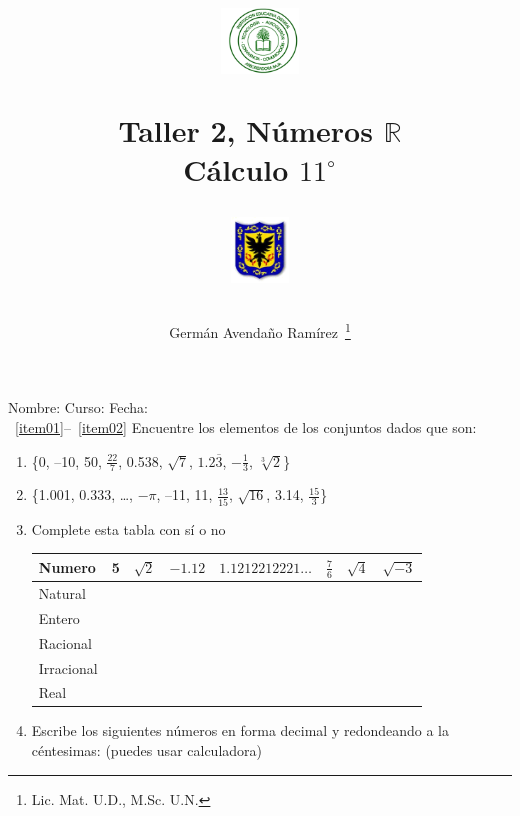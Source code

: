 \documentclass[10pt,twoside]{article}
\author{Germ\'an Avenda\~no Ram\'irez~\thanks{Lic. Mat. U.D., M.Sc. U.N.}}
\title{\begin{minipage}{.2\textwidth}
\includegraphics[height=1.75cm]{Images/logo-colegio.png}\end{minipage}
\begin{minipage}{.55\textwidth}
\begin{center}
Taller 2, Números $\mathbb{R}$\\
Cálculo $11^{\circ}$
\end{center}
\end{minipage}\hfill
\begin{minipage}{.2\textwidth}
\includegraphics[height=1.75cm]{Images/logo-sed.png} 
\end{minipage}}
\date{}
\begin{document}
\maketitle
Nombre: \hrulefill Curso: \underline{\hspace*{44pt}} Fecha: \underline{\hspace*{2.5cm}}\\

~\ref{item01}--~\ref{item02} Encuentre los elementos de los conjuntos dados que son:
\begin{enumerate}
\item \{0, --10, 50, $\frac{22}{7}$, 0.538, $\sqrt{7}$, $1.2\overline{3}$, $-\frac{1}{3}$, $\sqrt[3]{2}$\}\label{item01}
\item \{1.001, 0.333, \ldots, $-\pi$, --11, 11, $\frac{13}{15}$, $\sqrt{16}$, 3.14, $\frac{15}{3}$\}\label{item02}
\begin{enumerate}
\end{enumerate}
  \item Complete esta tabla con sí o no
  \begin{center}
  \begin{tabular}{|l|c|c|c|c|c|c|c|}
\hline 
Numero & 5 & $\sqrt{2}$ & $-1.12$ & $1.1212212221\ldots$ & $\frac{7}{6}$ & $\sqrt{4}$ & $\sqrt{-3}$ \\ 
\hline 
Natural &  &  &  &  &  &  &  \\ 
\hline 
Entero &  &  &  &  &  &  &  \\ 
\hline 
Racional &  &  &  &  &  &  &  \\ 
\hline 
Irracional &  &  &  &  &  &  &  \\ 
\hline 
Real &  &  &  &  &  &  &  \\ 
\hline 
\end{tabular} 
  \end{center}
    \item Escribe los siguientes números en forma decimal y redondeando a la céntesimas: (puedes usar calculadora)
  \begin{enumerate}
\end{enumerate}
\end{enumerate}
\end{document}
